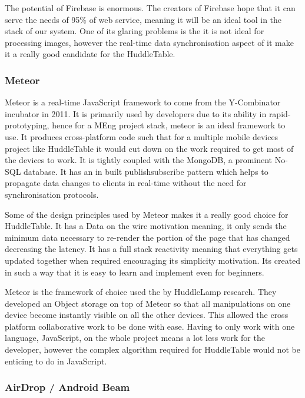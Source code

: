 The potential of Firebase is enormous. The creators of Firebase hope
that it can serve the needs of 95\% of web service\cite{firebase-wired},
meaning it will be an ideal tool in the stack of our system. One of
its glaring problems is the it is not ideal for processing images,
however the real-time data synchronisation aspect of it make it a
really good candidate for the HuddleTable.


\subsubsection{Meteor}

Meteor\cite{meteor} is a real-time JavaScript framework to come from
the Y-Combinator incubator in 2011. It is primarily used by developers
due to its ability in rapid-prototyping, hence for a MEng project
stack, meteor is an ideal framework to use. It produces cross-platform
code such that for a multiple mobile devices project like HuddleTable
it would cut down on the work required to get most of the devices
to work. It is tightly coupled with the MongoDB, a prominent No-SQL
database. It has an in built publish\textendash subscribe pattern\cite{pub-sub-pattern}
which helps to propagate data changes to clients in real-time without
the need for synchronisation protocols.

Some of the design principles used by Meteor makes it a really good
choice for HuddleTable. It has a Data on the wire motivation meaning,
it only sends the minimum data necessary to re-render the portion
of the page that has changed decreasing the latency. It has a full
stack reactivity\cite{meteor-wiki} meaning that everything gets updated
together when required encouraging its simplicity motivation. Its
created in such a way that it is easy to learn and implement even
for beginners. 

Meteor is the framework of choice used the by HuddleLamp research.
They developed an Object storage on top of Meteor so that all manipulations
on one device become instantly visible on all the other devices. This
allowed the cross platform collaborative work to be done with ease.
Having to only work with one language, JavaScript, on the whole project
means a lot less work for the developer, however the complex algorithm
required for HuddleTable would not be enticing to do in JavaScript.


\subsubsection{AirDrop / Android Beam}

